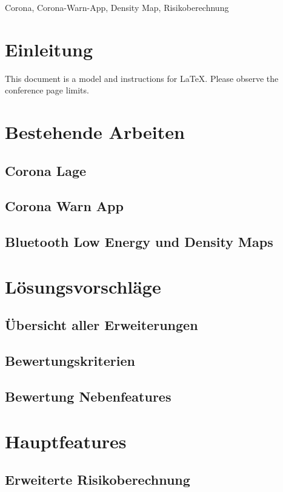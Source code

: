 \documentclass[conference]{IEEEtran}
\begin{document}
\begin{IEEEkeywords}
Corona, Corona-Warn-App, Density Map, Risikoberechnung
\end{IEEEkeywords}

\section{Einleitung}
This document is a model and instructions for \LaTeX.
Please observe the conference page limits. 

\section{Bestehende Arbeiten}

\subsection{Corona Lage}
\subsection{Corona Warn App}
\subsection{Bluetooth Low Energy und Density Maps}

\section{Lösungsvorschläge}


\subsection{Übersicht aller Erweiterungen}
\subsection{Bewertungskriterien}
\subsection{Bewertung Nebenfeatures}

\section{Hauptfeatures}
\subsection{Erweiterte Risikoberechnung}
\end{document}
